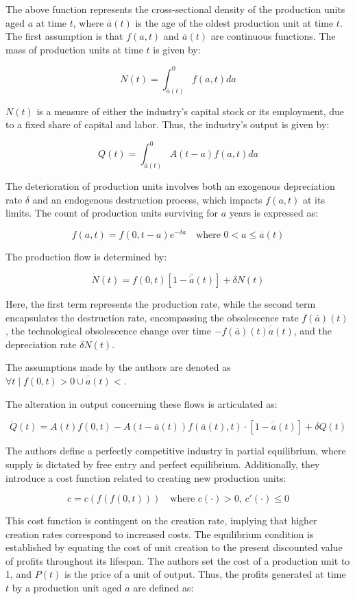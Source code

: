 \documentclass[12pt]{report}
\begin{document}
The above function represents the cross-sectional density of the production units aged \(a\) at time \(t\), where
\(\overline{a}(t)\) is the age of the oldest production unit at time \(t\). The first assumption is that \(f(a,t)\) and
\(\overline{a}(t)\) are continuous functions. The mass of production units at time \(t\) is given by:

\[N(t) = \int_{\overline{a}(t)}^{0}f(a,t)da\]

\(N(t)\) is a measure of either the industry's capital stock or its employment, due to a fixed share of capital and
labor. Thus, the industry's output is given by:

\[Q(t) = \int_{\overline{a}(t)}^{0}A(t-a)f(a,t)da\]

The deterioration of production units involves both an exogenous depreciation rate \(\delta\) and an endogenous
destruction process, which impacts \(f(a,t)\) at its limits. The count of production units surviving for \(a\) years is
expressed as: 

\[f(a,t)= f(0,t-a)e^{-\delta a} \quad \text{where } 0 < a \leq \overline{a}(t)\]

The production flow is determined by:

\[\dot{N}(t) = f(0,t) [1-\overline{\dot{a}}(t)] + \delta N(t)\]

Here, the first term represents the production rate, while the second term encapsulates the destruction rate,
encompassing the obsolescence rate \(f(\overline{a})(t)\), the technological obsolescence change over time
\(-f(\overline{a})(t)\overline{\dot{a}}(t)\), and the depreciation rate \(\delta N(t)\). 

The assumptions made by the authors are denoted as \(\forall t \mid f(0,t)>0 \cup  \overline{\dot{a}}(t)<\).

The alteration in output concerning these flows is articulated as:

\[\dot{Q}(t) = A(t)f(0,t) - A(t-\overline{a}(t))f(\overline{a}(t),t) \cdot [1-\overline{\dot{a}}(t)] + \delta Q(t)\]

The authors define a perfectly competitive industry in partial equilibrium, where supply is dictated by free entry and
perfect equilibrium. Additionally, they introduce a cost function related to creating new production units: 

\[c = c\left(f\left(f(0,t)\right)\right) \quad \text{where } c(\cdot)>0, \, c'(\cdot)\leq 0\]

This cost function is contingent on the creation rate, implying that higher creation rates correspond to increased
costs. The equilibrium condition is established by equating the cost of unit creation to the present discounted value of
profits throughout its lifespan. The authors set the cost of a production unit to 1, and \(P(t)\) is the price of a unit
of output. Thus, the profits generated at time \(t\) by a production unit aged \(a\) are defined as: 
\end{document}
